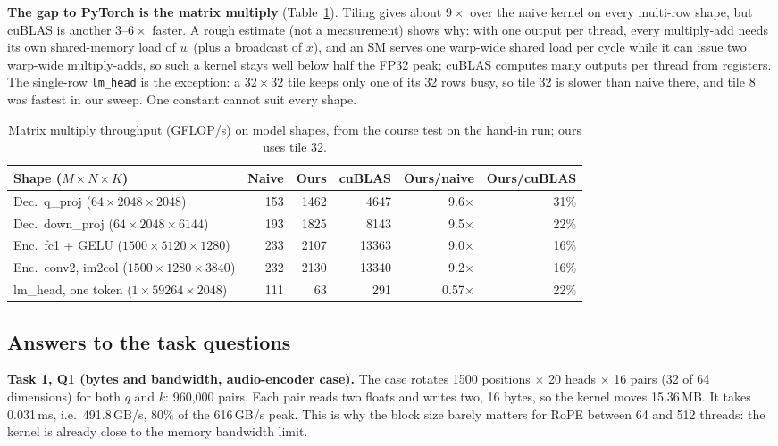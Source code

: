 \documentclass{article}
\begin{document}
\textbf{The gap to PyTorch is the matrix multiply} (Table~\ref{tab:gemm}). Tiling gives about $9\times$ over the naive kernel on every multi-row shape, but cuBLAS is another $3$--$6\times$ faster. A rough estimate (not a measurement) shows why: with one output per thread, every multiply-add needs its own shared-memory load of $w$ (plus a broadcast of $x$), and an SM serves one warp-wide shared load per cycle while it can issue two warp-wide multiply-adds, so such a kernel stays well below half the FP32 peak; cuBLAS computes many outputs per thread from registers. The single-row \texttt{lm\_head} is the exception: a $32\times32$ tile keeps only one of its 32 rows busy, so tile 32 is slower than naive there, and tile 8 was fastest in our sweep. One constant cannot suit every shape.

\begin{table}[t]
\caption{Matrix multiply throughput (GFLOP/s) on model shapes, from the course test on the hand-in run; ours uses tile 32.}
\label{tab:gemm}
\begin{center}
\footnotesize
\setlength{\tabcolsep}{4pt}
\begin{tabular}{lrrrrr}
\toprule
Shape ($M\times N\times K$) & Naive & Ours & cuBLAS & Ours/naive & Ours/cuBLAS \\
\midrule
Dec.\ q\_proj ($64\times2048\times2048$) & 153 & 1462 & 4647 & 9.6$\times$ & 31\% \\
Dec.\ down\_proj ($64\times2048\times6144$) & 193 & 1825 & 8143 & 9.5$\times$ & 22\% \\
Enc.\ fc1 + GELU ($1500\times5120\times1280$) & 233 & 2107 & 13363 & 9.0$\times$ & 16\% \\
Enc.\ conv2, im2col ($1500\times1280\times3840$) & 232 & 2130 & 13340 & 9.2$\times$ & 16\% \\
lm\_head, one token ($1\times59264\times2048$) & 111 & 63 & 291 & 0.57$\times$ & 22\% \\
\bottomrule
\end{tabular}
\end{center}
\end{table}

\subsection{Answers to the task questions}
\label{sec:questions}

\textbf{Task 1, Q1 (bytes and bandwidth, audio-encoder case).} The case rotates 1500 positions $\times$ 20 heads $\times$ 16 pairs (32 of 64 dimensions) for both $q$ and $k$: 960{,}000 pairs. Each pair reads two floats and writes two, 16 bytes, so the kernel moves 15.36\,MB. It takes 0.031\,ms, i.e.\ 491.8\,GB/s, 80\% of the 616\,GB/s peak. This is why the block size barely matters for RoPE between 64 and 512 threads: the kernel is already close to the memory bandwidth limit.
\end{document}
